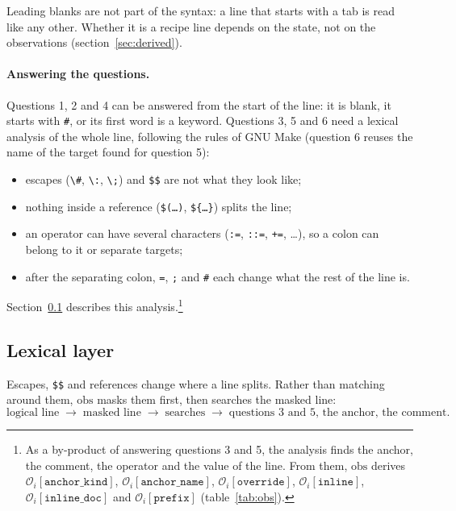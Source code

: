 \documentclass[11pt]{article}
\newcommand{\code}[1]{\mbox{\texttt{#1}}}
\newcommand{\obs}{\mathrm{obs}}
\newcommand{\field}[1]{\texttt{#1}}
\newcommand{\Obs}[1]{\mathcal{O}_i[\field{#1}]}
\begin{document}
Leading blanks are not part of the syntax: a line that starts with a tab is read like any
other. Whether it is a recipe line depends on the state, not on the observations
(section~\ref{sec:derived}).

\paragraph{Answering the questions.} Questions 1, 2 and 4 can be answered from the start of
the line: it is blank, it starts with \code{\#}, or its first word is a keyword. Questions 3,
5 and 6 need a lexical analysis of the whole line, following the rules of GNU Make
(question 6 reuses the name of the target found for question 5):
\begin{itemize}
  \item escapes (\code{\textbackslash\#}, \code{\textbackslash:}, \code{\textbackslash;})
        and \code{\$\$} are not what they look like;
  \item nothing inside a reference (\code{\$(\ldots)}, \code{\$\{\ldots\}}) splits the line;
  \item an operator can have several characters (\code{:=}, \code{::=}, \code{+=},
        \ldots), so a colon can belong to it or separate targets;
  \item after the separating colon, \code{=}, \code{;} and \code{\#} each change what the
        rest of the line is.
\end{itemize}
Section~\ref{sec:lexical} describes this analysis.\footnote{As a by-product of answering
  questions 3 and 5, the analysis finds the anchor, the comment, the operator and the value of
  the line. From them, $\obs$ derives $\Obs{anchor\_kind}$, $\Obs{anchor\_name}$,
  $\Obs{override}$, $\Obs{inline}$, $\Obs{inline\_doc}$ and $\Obs{prefix}$ (table~\ref{tab:obs}).}

\subsection{Lexical layer}
\label{sec:lexical}

Escapes, \code{\$\$} and references change where a line splits. Rather than matching around
them, $\obs$ masks them first, then searches the masked line:
\[
  \text{logical line} \;\to\; \text{masked line} \;\to\; \text{searches}
  \;\to\; \text{questions 3 and 5, the anchor, the comment.}
\]
\end{document}
